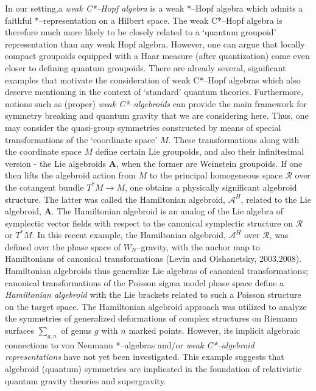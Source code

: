 \documentclass[12pt]{article}
\theoremstyle{plain}
\theoremstyle{definition}
\numberwithin{equation}{section}
\newcommand{\R}{\mathcal R}
\newcommand{\lra}{{\longrightarrow}}
\newcommand{\<}{{\langle}}
\begin{document}
In our setting,a \emph{weak C*--Hopf algebra} is a weak *--Hopf
algebra which admits a faithful *--representation on a Hilbert
space. The weak C*--Hopf algebra is therefore much more likely to
be closely related to a `quantum groupoid' representation than any
weak Hopf algebra. However, one can argue that locally compact
groupoids equipped with a Haar measure (after quantization) come
even closer to defining quantum groupoids. There are already
several, significant examples that motivate the consideration of
weak C*--Hopf algebras which also deserve mentioning in the
context of `standard' quantum theories. Furthermore, notions such
as (proper) \emph{weak C*--algebroids} can provide the main
framework for symmetry breaking and quantum gravity that we are
considering here. Thus, one may consider the quasi-group
symmetries constructed by means of special transformations of the
`coordinate space' $M$. These transformations along with the
coordinate space $M$ define certain Lie groupoids, and also their
infinitesimal version - the Lie algebroids $\mathbf{A}$, when the
former are Weinstein groupoids. If one then lifts the algebroid
action from $M$ to the principal homogeneous space $\R$ over the
cotangent bundle $T^*M \lra M$, one obtains a physically
significant algebroid structure. The latter was called the
Hamiltonian algebroid, ${\mathcal A}^H$, related to the Lie
algebroid, $\mathbf{A}$. The Hamiltonian algebroid is an analog of
the Lie algebra of symplectic vector fields with respect to the
canonical symplectic structure on $\R$ or $T^*M$. In this recent
example, the Hamiltonian algebroid, $\mathcal{A}^H$ over $\R$, was
defined over the phase space of $W_N$--gravity, with the anchor
map to Hamiltonians of canonical transformations (Levin and
Olshanetsky, 2003,2008). Hamiltonian algebroids thus generalize
Lie algebras of canonical transformations; canonical
transformations of the Poisson sigma model phase space define a
\emph{Hamiltonian algebroid} with the Lie brackets related to such
a Poisson structure on the target space. The Hamiltonian algebroid
approach was utilized to analyze the symmetries of generalized
deformations of complex structures on Riemann surfaces
$\sum_{g,n}$ of genus $g $ with $n$ marked points. However, its
implicit algebraic connections to von Neumann *--algebras and/or
\emph{weak C*--algebroid representations} have not yet been
investigated. This example suggests that algebroid (quantum)
symmetries are implicated in the foundation of relativistic
quantum gravity theories and supergravity.
\end{document}
